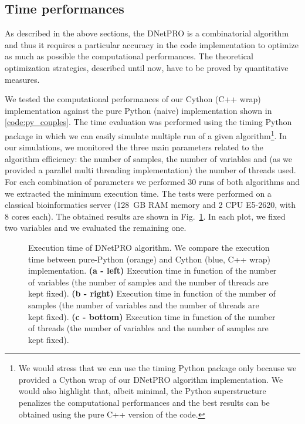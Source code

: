 \documentclass{standalone}
\begin{document}
\subsection[Time performances]{Time performances}\label{implementation:timing}

As described in the above sections, the \textsf{DNetPRO} is a combinatorial algorithm and thus it requires a particular accuracy in the code implementation to optimize as much as possible the computational performances.
The theoretical optimization strategies, described until now, have to be proved by quantitative measures.

We tested the computational performances of our \textsf{Cython} (\textsf{C++} wrap) implementation against the pure \textsf{Python} (naive) implementation shown in \ref{code:py_couples}.
The time evaluation was performed using the \textsf{timing} \textsf{Python} package in which we can easily simulate multiple run of a given algorithm\footnote{
  We would stress that we can use the \textsf{timing} \textsf{Python} package only because we provided a Cython wrap of our \textsf{DNetPRO} algorithm implementation.
  We would also highlight that, albeit minimal, the \textsf{Python} superstructure penalizes the computational performances and the best results can be obtained using the pure \textsf{C++} version of the code.
}.
In our simulations, we monitored the three main parameters related to the algorithm efficiency: the number of samples, the number of variables and (as we provided a parallel multi threading implementation) the number of threads used.
For each combination of parameters we performed 30 runs of both algorithms and we extracted the minimum execution time.
The tests were performed on a classical bioinformatics server (128~GB RAM memory and 2 CPU E5-2620, with 8 cores each).
The obtained results are shown in Fig.~\ref{fig:dnetpro_timing}.
In each plot, we fixed two variables and we evaluated the remaining one.

\begin{figure}[htbp]
\hspace{-1.0cm}
\def\svgwidth{0.45\textwidth}

\qquad
\hspace{1.0cm}
\def\svgwidth{0.45\textwidth}

\qquad\qquad
\centering
\def\svgwidth{0.7\textwidth}

\caption{Execution time of \textsf{DNetPRO} algorithm.
We compare the execution time between pure-\textsf{Python} (orange) and Cython (blue, \textsf{C++} wrap) implementation.
\textbf{(a - left)} Execution time in function of the number of variables (the number of samples and the number of threads are kept fixed).
\textbf{(b - right)} Execution time in function of the number of samples (the number of variables and the number of threads are kept fixed).
\textbf{(c - bottom)} Execution time in function of the number of threads (the number of variables and the number of samples are kept fixed).
}
\label{fig:dnetpro_timing}
\end{figure}
\end{document}
